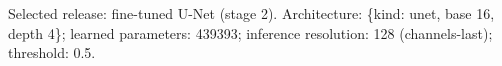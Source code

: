Selected release: fine-tuned U-Net (stage 2). Architecture: \{kind: unet, base 16, depth 4\}; learned parameters: 439393; inference resolution: 128 (channels-last); threshold: 0.5.